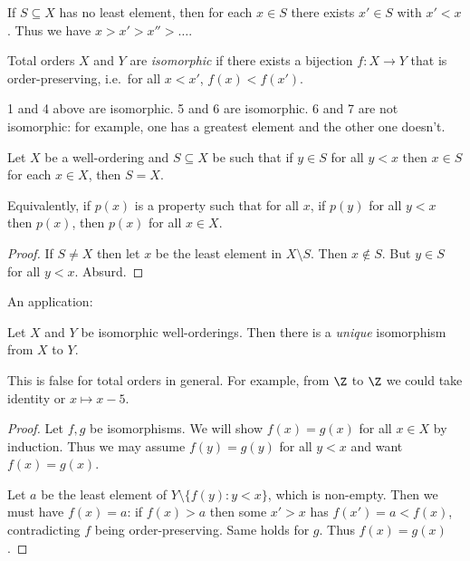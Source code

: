 \documentclass[a4paper]{article}
\begin{document}
\begin{corollary}
  If \(S \subseteq X\) has no least element, then for each \(x \in S\) there exists \(x' \in S\) with \(x' < x\). Thus we have \(x > x' > x'' > \dots\).
\end{corollary}

\begin{definition}
  Total orders \(X\) and \(Y\) are \emph{isomorphic} if there exists a bijection \(f: X \to Y\) that is order-preserving, i.e.\ for all \(x < x'\), \(f(x) < f(x')\).
\end{definition}

\begin{eg}
  1 and 4 above are isomorphic. 5 and 6 are isomorphic. 6 and 7 are not isomorphic: for example, one has a greatest element and the other one doesn't.
\end{eg}

\begin{proposition}
  Let \(X\) be a well-ordering and \(S \subseteq X\) be such that if \(y \in S\) for all \(y < x\) then \(x \in S\) for each \(x \in X\), then \(S = X\).

  Equivalently, if \(p(x)\) is a property such that for all \(x\), if \(p(y)\) for all \(y < x\) then \(p(x)\), then \(p(x)\) for all \(x \in X\).
\end{proposition}

\begin{proof}
  If \(S \neq X\) then let \(x\) be the least element in \(X \setminus S\). Then \(x \notin S\). But \(y \in S\) for all \(y < x\). Absurd.
\end{proof}

An application:

\begin{proposition}
  Let \(X\) and \(Y\) be isomorphic well-orderings. Then there is a \emph{unique} isomorphism from \(X\) to \(Y\).
\end{proposition}

\begin{remark}
  This is false for total orders in general. For example, from \(\Z\) to \(\Z\) we could take identity or \(x \mapsto x - 5\).
\end{remark}

\begin{proof}
  Let \(f, g\) be isomorphisms. We will show \(f(x) = g(x)\) for all \(x \in X\) by induction. Thus we may assume \(f(y) = g(y)\) for all \(y < x\) and want \(f(x) = g(x)\).

  Let \(a\) be the least element of \(Y \setminus \{f(y): y < x\}\), which is non-empty. Then we must have \(f(x) = a\): if \(f(x) > a\) then some \(x' > x\) has \(f(x') = a < f(x)\), contradicting \(f\) being order-preserving. Same holds for \(g\). Thus \(f(x) = g(x)\).
\end{proof}
\end{document}

